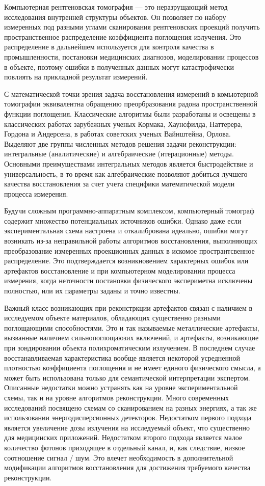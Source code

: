 {\actualityandprogress}

Компьютерная рентгеновская томография --- это неразрущающий метод исследования внутренней структуры объектов.
Он позволяет по набору измеренных под разными углами сканирования рентгеновских проекций получить пространственное распределение коэффициента поглощения излучения.
Это распределение в дальнейшем используется для контроля качества в промышленности, постановки медицинских диагнозов, моделировании процессов в объекте, поэтому ошибки в полученных данных могут катастрофически повлиять на прикладной результат измерений.

С математической точки зрения задача восстановления измерений в комьютерной томографии эквивалентна обращению преорбразования радона пространственной функции поглощения. 
Классические алгоритмы были разработаны и освещены в классических работах зарубежных ученых Кормака, Хаунсфилда, Наттерера, Гордона и Андерсена, в работах советских ученых Вайнштейна, Орлова.
Выделяют две группы численных методов решения задачи реконструкции: интегральные (аналитические) и алгебраические (итерационные) методы.
Основными преимуществами интегральных методов является быстродействие и универсальность, в то время как алгебраические позволяют добиться лучшего качества восстановления за счет учета специфики математической модели процесса измерения.

Будучи сложным программно-аппаратным комплексом, компьютерный томограф содержит множество потенциальных источников ошибки.
Однако даже если экспериментальная схема настроена и откалибрована идеально, ошибки могут возникать из-за неправильной работы алгоритмов восстановления, выполняющих преобразование измеренных проекционных данных в искомое пространтсвенное распределение.
Это подтверждается возникновением характерных ошибок или артефактов восстановление и при компьютерном моделировании процесса измерения, когда неточности постановки физического экспериметна исключены полностью, или их параметры заданы и точно известны.

Важный класс возникающих при реконстркции артефактов связан с наличием в исследуемом объекте материалов, обладающих существенно разными поглощающими способностями.
Это и так называемые металлические артефакты, вызванные наличием сильнопоглощаюзих включений, и артефакты, возникающие при зондировании объекта полихроматическим излучением.
В последнем случае восстанавливаемая характеристика вообще является некоторой усредненной плотностью коэффициента поглощения и не имеет единого физического смысла, а может быть использована только для семантической интерпретации экспертом.
Описанные недостатки можно устранять как на уровне экспериментальной схемы, так и на уровне алгоритмов реконструкции.
Много современных исследований посвящено схемам со сканированием на разных энергиях, а так же использовании энергодисперсионных детекторов.
Недостатком первого подхода является увеличение дозы излучения на исследуемый объект, что существенно для медицинских приложений.
Недостатком второго подхода является малое количество фотонов приходящее в отдельный канал, и, как следствие, низкое соотношение сигнал / шум. 
Это влечет необходимость в дополнительной модификации алгоритмов восстановления для достижения требуемого качества реконструкции.


